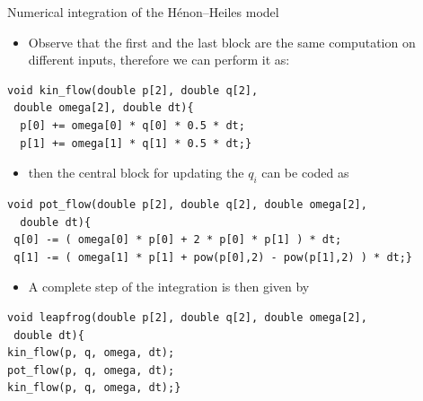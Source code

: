 \documentclass[xcolor={svgnames,usenames}]{beamer}
\begin{document}
\begin{frame}[fragile]{Numerical integration of the H\'enon--Heiles model}
\small\vspace{-1.5em}
\begin{itemize}
	\item Observe that the first and the last block are the same computation on different inputs, therefore we can perform it as:
\end{itemize}\vspace{-1em}
\begin{verbatim}
void kin_flow(double p[2], double q[2], 
 double omega[2], double dt){
  p[0] += omega[0] * q[0] * 0.5 * dt;
  p[1] += omega[1] * q[1] * 0.5 * dt;}
\end{verbatim}
\begin{itemize}
	\item then the central block for updating the $q_i$ can be coded as
\end{itemize}\vspace{-1em}
\begin{verbatim}
void pot_flow(double p[2], double q[2], double omega[2], 
  double dt){
 q[0] -= ( omega[0] * p[0] + 2 * p[0] * p[1] ) * dt;
 q[1] -= ( omega[1] * p[1] + pow(p[0],2) - pow(p[1],2) ) * dt;}
\end{verbatim}
\begin{itemize}
	\item A complete step of the integration is then given by
\end{itemize}\vspace{-1em}
\begin{verbatim}
void leapfrog(double p[2], double q[2], double omega[2], 
 double dt){
kin_flow(p, q, omega, dt);
pot_flow(p, q, omega, dt);
kin_flow(p, q, omega, dt);}
\end{verbatim}
\end{frame}
\end{document}
